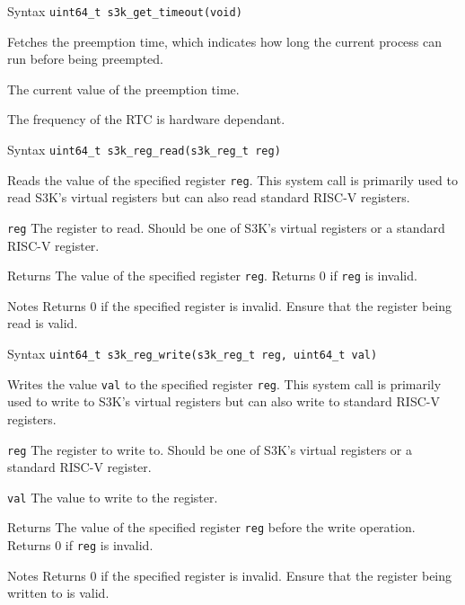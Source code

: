 \documentclass[a4paper,11pt]{article}
\newcommand{\syscall}[1]{\texttt{#1}}
\newenvironment{syscalldoc}[1]{
  \begin{tcolorbox}[breakable,title=\subsection{\syscall{#1}}]
  \begin{description}[leftmargin=!,style=nextline,noitemsep]
}{
  \end{description}
  \end{tcolorbox}
}
\begin{document}
\begin{syscalldoc}{s3k\_get\_timeout}
  \item[Syntax] \lstinline{uint64_t s3k_get_timeout(void)}
  \item[Description] Fetches the preemption time, which indicates how long the current process can run before being preempted.
  \item[Returns] The current value of the preemption time.
  \item[Notes] The frequency of the RTC is hardware dependant.
\end{syscalldoc}

\begin{syscalldoc}{s3k\_reg\_read}
  \item[Syntax] \lstinline{uint64_t s3k_reg_read(s3k_reg_t reg)}
  \item[Description] Reads the value of the specified register \verb|reg|. This system call is primarily used to read S3K's virtual registers but can also read standard RISC-V registers.
  \item[Parameters]
    \begin{description}
      \item[]
      \item[\texttt{reg}] The register to read. Should be one of S3K's virtual registers or a standard RISC-V register.
    \end{description}
  \item[Returns] The value of the specified register \verb|reg|. Returns 0 if \verb|reg| is invalid.
  \item[Notes] Returns 0 if the specified register is invalid. Ensure that the register being read is valid.
\end{syscalldoc}

\begin{syscalldoc}{s3k\_reg\_write}
  \item[Syntax] \lstinline{uint64_t s3k_reg_write(s3k_reg_t reg, uint64_t val)}
  \item[Description] Writes the value \verb|val| to the specified register \verb|reg|. This system call is primarily used to write to S3K's virtual registers but can also write to standard RISC-V registers.
  \item[Parameters]
    \begin{description}
      \item[]
      \item[\texttt{reg}] The register to write to. Should be one of S3K's virtual registers or a standard RISC-V register.
      \item[\texttt{val}] The value to write to the register.
    \end{description}
  \item[Returns] The value of the specified register \verb|reg| before the write operation. Returns 0 if \verb|reg| is invalid.
  \item[Notes] Returns 0 if the specified register is invalid. Ensure that the register being written to is valid.
\end{syscalldoc}
\end{document}
